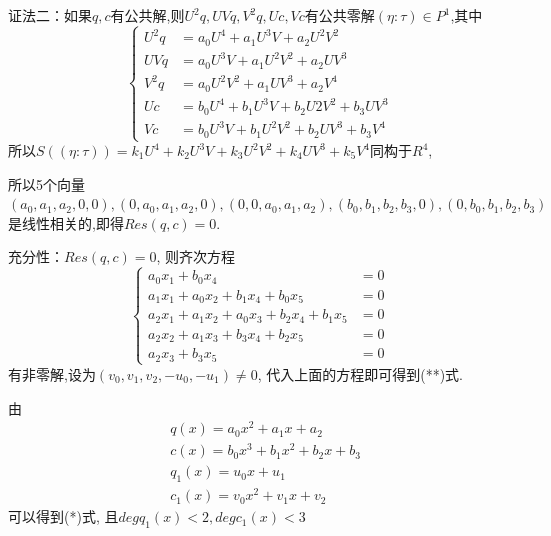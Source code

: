 \documentclass[UTF8]{book}
\begin{document}
			
			证法二：如果$ q,c $有公共解,则$U^{2}q, UVq, V^{2}q, Uc, Vc $有公共零解$(\eta:\tau)\in P^{1}$,其中
			\begin{equation*}
			  \left\{
			   \begin{aligned}
			   U^{2}q &=a_{0}U^{4}+a_{1}U^{3}V+a_{2}U^{2}V^{2} \\
			  UVq &= a_{0}U^{3}V+a_{1}U^{2}V^{2}+a_{2}UV^{3}\\
			    V^{2}q &= a_{0}U^{2}V^{2}+a_{1}UV^{3}+a_{2}V^{4}\\
			   Uc &= b_{0}U^{4}+b_{1}U^{3}V+b_{2}U{2}V^{2}+b_{3}UV^{3}\\
			    Vc &=b_{0}U^{3}V+b_{1}U^{2}V^{2}+b_{2}UV^{3}+b_{3}V^{4}
			   \end{aligned}
			   \right.
			\end{equation*}
			   所以$S((\eta:\tau))=k_{1}U^{4}+k_{2}U^{3}V+k_{3}U^{2}V^{2}+k_{4}UV^{3}+k_{5}V^{4}$同构于$R^{4}$,
			
			   所以5个向量$(a_{0},a_{1},a_{2},0,0),(0,a_{0},a_{1},a_{2},0), (0,0,a_{0}, a_{1},a_{2}),(b_{0}, b_{1},b_{2},b_{3},0), (0,b_{0},b_{1},b_{2},b_{3})$是线性相关的,即得$ Res(q,c)=0 $.
			
			   充分性：$ Res(q,c)=0 $, 则齐次方程
			   \begin{equation*}
			  \left\{
			   \begin{aligned}
			   a_{0}x_{1}+b_{0}x_{4} &=0 \\
			  a_{1}x_{1}+a_{0}x_{2}+b_{1}x_{4}+b_{0}x_{5} &=0\\
			    a_{2}x_{1}+a_{1}x_{2}+a_{0}x_{3}+b_{2}x_{4}+b_{1}x_{5} &=0\\
			    a_{2}x_{2}+a_{1}x_{3}+b_{3}x_{4}+b_{2}x_{5} &=0\\
			    a_{2}x_{3}+b_{3}x_{5} &=0
			   \end{aligned}
			   \right.
			   \end{equation*}
			   有非零解,设为$(v_{0},v_{1},v_{2},-u_{0},-u_{1})\neq0$, 代入上面的方程即可得到(**)式.
			
			   由
			   \begin{equation*}
			     \begin{aligned}
			   &q(x) =a_{0}x^{2}+a_{1}x+a_{2} \\
			 & c(x) =b_{0}x^{3}+b_{1}x^{2}+b_{2}x+b_{3}\\
			 & q_{1}(x) =u_{0}x+u_{1}\\
			 &  c_{1}(x) =v_{0}x^{2}+v_{1}x+v_{2}
			   \end{aligned}
			  \end{equation*}
			  可以得到(*)式, 且$deg q_{1}(x)<2,deg c_{1}(x)<3$
			
\end{document}
